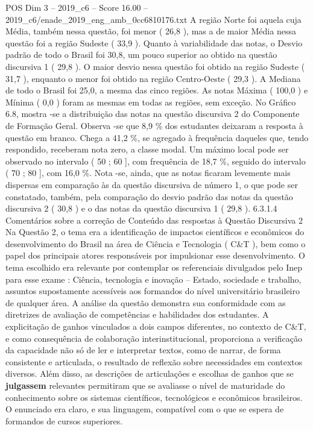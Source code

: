 \begin{textsample}{POS Dim 3 – 2019\_c6 – Score 16.00 – 2019\_c6/enade\_2019\_eng\_amb\_0cc6810176.txt}
A região Norte foi aquela cuja Média, também nessa questão, foi menor ( 26,8 ), mas a de maior Média nessa questão foi a região Sudeste ( 33,9 ).
Quanto à variabilidade das notas, o Desvio padrão de todo o Brasil foi 30,8, um pouco superior ao obtido na questão discursiva 1 ( 29,8 ).
O maior desvio nessa questão foi obtido na região Sudeste ( 31,7 ), enquanto o menor foi obtido na região Centro-Oeste ( 29,3 ).
A Mediana de todo o Brasil foi 25,0, a mesma das cinco regiões.
As notas Máxima ( 100,0 ) e Mínima ( 0,0 ) foram as mesmas em todas as regiões, sem exceção.
No Gráfico 6.8, mostra -se a distribuição das notas na questão discursiva 2 do Componente de Formação Geral.
Observa -se que 8,9 \% dos estudantes deixaram a resposta à questão em branco.
Chega a 41,2 \%, se agregado à frequência daqueles que, tendo respondido, receberam nota zero, a classe modal.
Um máximo local pode ser observado no intervalo ( 50 ; 60 ], com frequência de 18,7 \%, seguido do intervalo ( 70 ; 80 ], com 16,0 \%.
Nota -se, ainda, que as notas ficaram levemente mais dispersas em comparação às da questão discursiva de número 1, o que pode ser constatado, também, pela comparação do desvio padrão das notas da questão discursiva 2 ( 30,8 ) e o das notas da questão discursiva 1 ( 29,8 ). 6.3.1.4 Comentários sobre a correção de Conteúdo das respostas à Questão Discursiva 2 Na Questão 2, o tema era a identificação de impactos científicos e econômicos do desenvolvimento do Brasil na área de Ciência e Tecnologia ( C\&T ), bem como o papel dos principais atores responsáveis por impulsionar esse desenvolvimento.
O tema escolhido era relevante por contemplar os referenciais divulgados pelo Inep para esse exame : Ciência, tecnologia e inovação – Estado, sociedade e trabalho, assuntos supostamente acessíveis aos formandos do nível universitário brasileiro de qualquer área.
A análise da questão demonstra sua conformidade com as diretrizes de avaliação de competências e habilidades dos estudantes.
A explicitação de ganhos vinculados a dois campos diferentes, no contexto de C\&T, e como consequência de colaboração interinstitucional, proporciona a verificação da capacidade não só de ler e interpretar textos, como de narrar, de forma consistente e articulada, o resultado de reflexão sobre necessidades em contextos diversos.
Além disso, as descrições de articulações e escolhas de ganhos que se \textbf{julgassem} relevantes permitiram que se avaliasse o nível de maturidade do conhecimento sobre os sistemas científicos, tecnológicos e econômicos brasileiros.
O enunciado era claro, e sua linguagem, compatível com o que se espera de formandos de cursos superiores.

\end{textsample}
